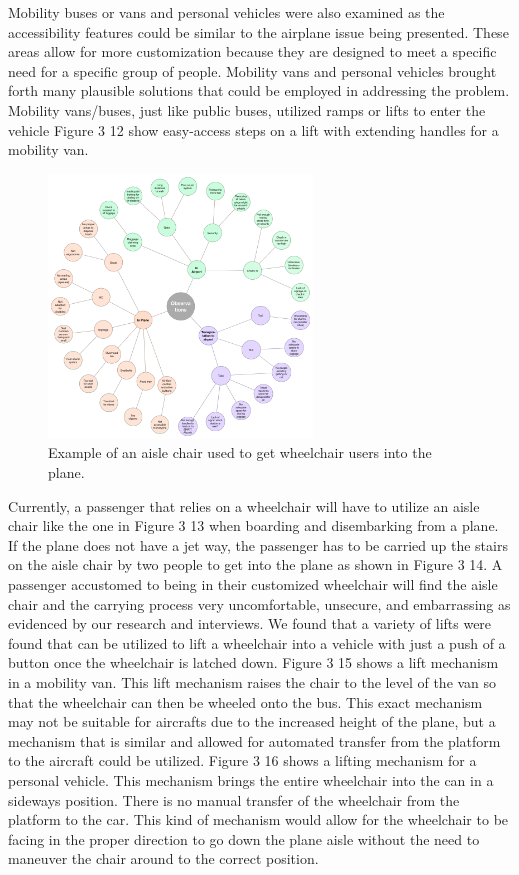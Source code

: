 \documentclass[a4paper, 12pt,conference]{new_cit_thesis}
\begin{document}
Mobility buses or vans and personal vehicles were also examined as the accessibility features could be similar to the airplane issue being presented. These areas allow for more customization because they are designed to meet a specific need for a specific group of people.  Mobility vans and personal vehicles brought forth many plausible solutions that could be employed in addressing the problem.  Mobility vans/buses, just like public buses, utilized ramps or lifts to enter the vehicle Figure 3 12 show easy-access steps on a lift with extending handles for a mobility van.  

\begin{figure}[h]
  \centering
     \includegraphics[width=7cm]{images/image040}
   \caption{Example of an aisle chair used to get wheelchair users into the plane.}
  \label{fig:40}
\end{figure}

Currently, a passenger that relies on a wheelchair will have to utilize an aisle chair like the one in Figure 3 13 when boarding and disembarking from a plane.  If the plane does not have a jet way, the passenger has to be carried up the stairs on the aisle chair by two people to get into the plane as shown in Figure 3 14. A passenger accustomed to being in their customized wheelchair will find the aisle chair and the carrying process very uncomfortable, unsecure, and embarrassing as evidenced by our research and interviews. We found that a variety of lifts were found that can be utilized to lift a wheelchair into a vehicle with just a push of a button once the wheelchair is latched down. Figure 3 15 shows a lift mechanism in a mobility van.  This lift mechanism raises the chair to the level of the van so that the wheelchair can then be wheeled onto the bus. This exact mechanism may not be suitable for aircrafts due to the increased height of the plane, but a mechanism that is similar and allowed for automated transfer from the platform to the aircraft could be utilized.  Figure 3 16 shows a lifting mechanism for a personal vehicle.  This mechanism brings the entire wheelchair into the can in a sideways position.  There is no manual transfer of the wheelchair from the platform to the car.  This kind of mechanism would allow for the wheelchair to be facing in the proper direction to go down the plane aisle without the need to maneuver the chair around to the correct position.
\end{document}
